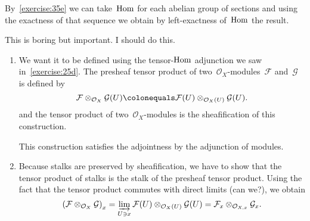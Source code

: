 \begin{exercise}
  By~\autoref{exercise:35e} we can take~$\operatorname{Hom}$ for each abelian group of sections and using the exactness of that sequence we obtain by left-exactness of~$\operatorname{Hom}$ the result.
\end{exercise}

\begin{exercise} %
  This is boring but important. I should do this.
\end{exercise}

\begin{exercise} %
  \begin{enumerate}
    \item We want it to be defined using the tensor-$\operatorname{Hom}$ adjunction we saw in~\autoref{exercise:25d}. The presheaf tensor product of two~$\mathcal{O}_X$-modules~$\mathcal{F}$ and~$\mathcal{G}$ is defined by
      \begin{equation}
        \mathcal{F}\otimes_{\mathcal{O}_X}\mathcal{G}(U)\colonequals\mathcal{F}(U)\otimes_{\mathcal{O}_X(U)}\mathcal{G}(U).
      \end{equation}
      and the tensor product of two~$\mathcal{O}_X$\nobreakdash-modules is the sheafification of this construction.

      This construction satisfies the adjointness by the adjunction of modules.

    \item Because stalks are preserved by sheafification, we have to show that the tensor product of stalks is the stalk of the presheaf tensor product. Using the fact that the tensor product commutes with direct limits (can we?), we obtain
      \begin{equation}
        \left( \mathcal{F}\otimes_{\mathcal{O}_X}\mathcal{G} \right)_x=\varinjlim_{U\ni x}\mathcal{F}(U)\otimes_{\mathcal{O}_X(U)}\mathcal{G}(U)=\mathcal{F}_x\otimes_{\mathcal{O}_{X,x}}\mathcal{G}_x.
      \end{equation}
  \end{enumerate}
\end{exercise}
